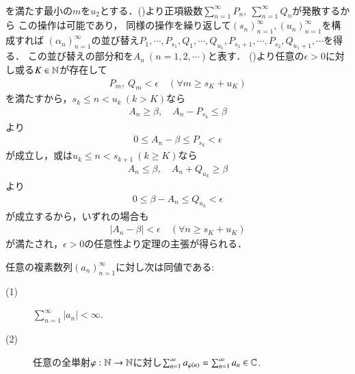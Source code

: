 \begin{prf}
\begin{align}
		\end{align}
		を満たす最小の$m$を$u_2$とする．()より正項級数$\sum_{n=1}^{\infty} P_n,\ \sum_{n=1}^{\infty} Q_n$が発散するから
		この操作は可能であり，
		同様の操作を繰り返して$(s_n)_{n=1}^{\infty},(u_n)_{n=1}^{\infty}$を構成すれば
		$(\alpha_n)_{n=1}^{\infty}$の並び替え$P_1,\cdots,P_{s_1},Q_1,\cdots,Q_{u_1},P_{s_1+1},\cdots,P_{s_2},Q_{u_1+1},\cdots$を得る．
		この並び替えの部分和を$A_n\ (n=1,2,\cdots)$と表す．
		()より任意の$\epsilon > 0$に対し或る$K \in \mathbb{N}$が存在して
		\begin{align}
			P_m,\ Q_m < \epsilon
			\quad ( \forall m \geq s_K + u_K )
		\end{align}
		を満たすから，$s_k \leq n < u_k\ (k > K)$なら
		\begin{align}
			A_n \geq \beta,
			\quad A_n - P_{s_k} \leq \beta
		\end{align}
		より
		\begin{align}
			0 \leq A_n - \beta \leq P_{s_k} < \epsilon
		\end{align}
		が成立し，或は$u_k \leq n < s_{k+1}\ (k \geq K)$なら
		\begin{align}
			A_n \leq \beta,
			\quad A_n + Q_{u_k} \geq \beta
		\end{align}
		より
		\begin{align}
			0 \leq \beta - A_n \leq Q_{u_k} < \epsilon
		\end{align}
		が成立するから，いずれの場合も
		\begin{align}
			|A_n - \beta| < \epsilon \quad ( \forall n \geq s_K + u_K )
		\end{align}
		が満たされ，$\epsilon > 0$の任意性より定理の主張が得られる．
		\QED
	\end{prf}
	
	\begin{screen}
		\begin{cor}[絶対収束と無条件収束は同値]
			任意の複素数列$(a_n)_{n=1}^{\infty}$に対し次は同値である:
			\begin{description}
				\item[(1)] $\sum_{n=1}^{\infty} |a_n| < \infty$.
				\item[(2)] 任意の全単射$\varphi:\mathbb{N} \rightarrow \mathbb{N}$に対し$\sum_{n=1}^{\infty} a_{\varphi(n)} = \sum_{n=1}^{\infty} a_n \in \mathbb{C}$.
			\end{description}
			\label{cor:Riemann_series}
		\end{cor}
	\end{screen}
	

